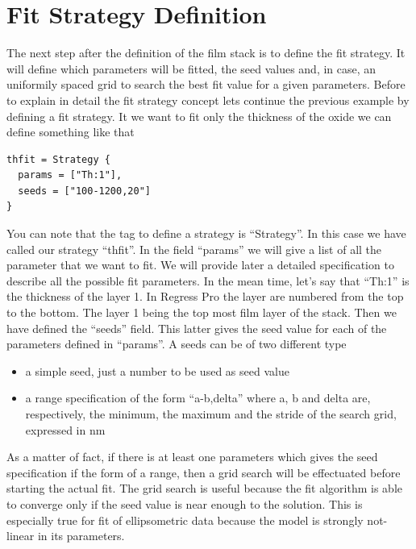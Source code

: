 \documentclass[a4paper]{report}
\begin{document}
\section{Fit Strategy Definition}
The next step after the definition of the film stack is to define the
fit strategy. It will define which parameters will be fitted, the seed
values and, in case, an uniformily spaced grid to search the best fit
value for a given parameters. Before to explain in detail the fit
strategy concept lets continue the previous example by defining a fit
strategy. It we want to fit only the thickness of the oxide we can
define something like that
\begin{verbatim}
thfit = Strategy {
  params = ["Th:1"],
  seeds = ["100-1200,20"]
}
\end{verbatim}
You can note that the tag to define a strategy is ``Strategy''. In
this case we have called our strategy ``thfit''. In the field
``params'' we will give a list of all the parameter that we want to
fit. We will provide later a detailed specification to describe all
the possible fit parameters. In the mean time, let's say that ``Th:1''
is the thickness of the layer 1. In Regress Pro the layer are numbered
from the top to the bottom. The layer 1 being the top most film layer
of the stack. Then we have defined the ``seeds'' field. This latter
gives the seed value for each of the parameters defined in
``params''. A seeds can be of two different type
\begin{itemize}
  \item a simple seed, just a number to be used as seed value
  \item a range specification of the form ``a-b,delta'' where a, b and
  delta are, respectively, the minimum, the maximum and the stride of
  the search grid, expressed in nm
\end{itemize}
As a matter of fact, if there is at least one parameters which gives
the seed specification if the form of a range, then a grid search will
be effectuated before starting the actual fit. The grid search is
useful because the fit algorithm is able to converge only if the seed
value is near enough to the solution. This is especially true for fit
of ellipsometric data because the model is strongly not-linear in its
parameters.
\end{document}
